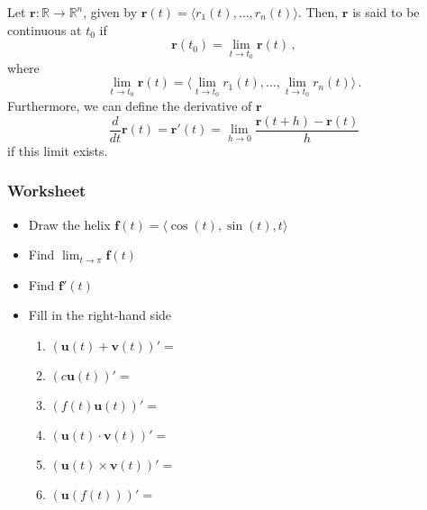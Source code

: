 \documentclass[aspectratio=169]{beamer}
\newcommand{\vect}{\mathbf}
\newcommand{\R}{\mathbb{R}}
\begin{document}
\begin{frame}
    \begin{theorem}
    Let $\vect{r}: \R \to \R^n$, given by $\vect{r}(t) = \langle r_1(t), \dots , r_n(t) \rangle$.
    Then, $\vect{r}$ is said to be continuous at $t_0$ if
    \begin{equation*}
        \vect{r}(t_0) = \lim_{t\to t_0} \vect{r}(t) \,,
    \end{equation*}
    where
    \begin{equation*}
        \lim_{t\to t_0} \vect{r}(t) = \langle \lim_{t\to t_0}r_1(t) , \dots , \lim_{t\to t_0} r_n(t) \rangle \,. 
    \end{equation*}
    Furthermore, we can define the derivative of $\vect{r}$
    \begin{equation*}
        \frac{d}{dt} \vect{r}(t) = \vect{r}'(t) = \lim_{h\to 0} \frac{\vect{r}(t+h) - \vect{r}(t)}{h} 
    \end{equation*}
    if this limit exists.
    \end{theorem}
\end{frame}
\begin{frame}
    \frametitle{Worksheet}
    \begin{itemize}
        \item Draw the helix $\vect{f}(t) = \langle \cos(t),\sin(t), t \rangle$
        \item Find $\lim_{t\to \pi} \vect{f}(t)$
        \item Find $\vect{f}'(t)$
        \item Fill in the right-hand side
            \begin{enumerate}
            \item  $(\vect{u}(t) + \vect{v}(t))' = $
            \item  $(c \vect{u}(t))' = $
            \item  $(f(t) \vect{u}(t))' = $
            \item  $(\vect{u}(t) \cdot \vect{v}(t))' = $
            \item  $(\vect{u}(t) \times \vect{v}(t))' = $
            \item  $(\vect{u}(f(t)))' = $
            \end{enumerate}
    \end{itemize}
\end{frame}
\end{document}
